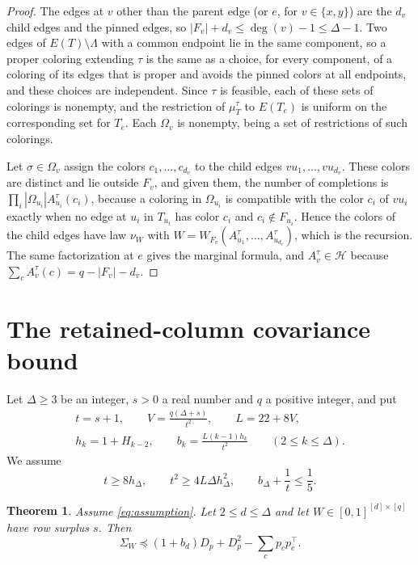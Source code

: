\documentclass{amsart}
\numberwithin{equation}{section}
\theoremstyle{plain}
\newtheorem{theorem}{Theorem}[section]
\theoremstyle{definition}
\theoremstyle{remark}
\newcommand{\cH}{\mathcal{H}}
\newcommand{\T}{\top}
\begin{document}
\begin{proof}
The edges at $v$ other than the parent edge (or $e$, for $v\in\{x,y\}$) are the $d_v$ child edges and the pinned edges, so $|F_v|+d_v\le\deg(v)-1\le\Delta-1$. Two edges of $E(T)\setminus\Lambda$ with a common endpoint lie in the same component, so a proper coloring extending $\tau$ is the same as a choice, for every component, of a coloring of its edges that is proper and avoids the pinned colors at all endpoints, and these choices are independent. Since $\tau$ is feasible, each of these sets of colorings is nonempty, and the restriction of $\mu_T^\tau$ to $E(T_e)$ is uniform on the corresponding set for $T_e$. Each $\Omega_v$ is nonempty, being a set of restrictions of such colorings.

Let $\sigma\in\Omega_v$ assign the colors $c_1,\dots,c_{d_v}$ to the child edges $vu_1,\dots,vu_{d_v}$. These colors are distinct and lie outside $F_v$, and given them, the number of completions is $\prod_i|\Omega_{u_i}|A_{u_i}^\tau(c_i)$, because a coloring in $\Omega_{u_i}$ is compatible with the color $c_i$ of $vu_i$ exactly when no edge at $u_i$ in $T_{u_i}$ has color $c_i$ and $c_i\notin F_{u_i}$. Hence the colors of the child edges have law $\nu_W$ with $W=W_{F_v}(A_{u_1}^\tau,\dots,A_{u_{d_v}}^\tau)$, which is the recursion. The same factorization at $e$ gives the marginal formula, and $A_v^\tau\in\cH$ because $\sum_cA_v^\tau(c)=q-|F_v|-d_v$.
\end{proof}

\section{The retained-column covariance bound}\label{sec:column}

Let $\Delta\ge3$ be an integer, $s>0$ a real number and $q$ a positive integer, and put
\begin{equation}\label{eq:constants}
\begin{gathered}
t=s+1,\qquad V=\frac{q(\Delta+s)}{t^2},\qquad L=22+8V,\\
h_k=1+H_{k-2},\qquad b_k=\frac{L(k-1)h_k}{t^2}\qquad(2\le k\le\Delta).
\end{gathered}
\end{equation}
We assume
\begin{equation}\label{eq:assumption}
t\ge8h_\Delta,\qquad t^2\ge4L\Delta h_\Delta^2,\qquad b_\Delta+\frac1t\le\frac15 .
\end{equation}

\begin{theorem}\label{thm:column}
Assume \eqref{eq:assumption}. Let $2\le d\le\Delta$ and let $W\in[0,1]^{[d]\times[q]}$ have row surplus $s$. Then
\[
\Sigma_W\preceq(1+b_d)D_p+D_p^2-\sum_cp_cp_c^\T .
\]
\end{theorem}
\end{document}
